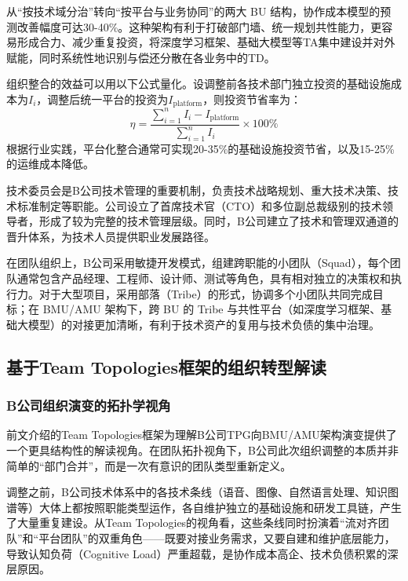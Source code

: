 从“按技术域分治”转向“按平台与业务协同”的两大 BU 结构，协作成本模型的预测改善幅度可达30-40\%。这种架构有利于打破部门墙、统一规划共性能力，更容易形成合力、减少重复投资，将深度学习框架、基础大模型等TA集中建设并对外赋能，同时系统性地识别与偿还分散在各业务中的TD\cite{li2015systematic,seaman2014measuring}。

组织整合的效益可以用以下公式量化。设调整前各技术部门独立投资的基础设施成本为$I_i$，调整后统一平台的投资为$I_{\mathrm{platform}}$，则投资节省率为：
\begin{equation}
\eta = \frac{\sum_{i=1}^{n} I_i - I_{\mathrm{platform}}}{\sum_{i=1}^{n} I_i} \times 100\%
\label{eq:platform-saving}
\end{equation}
根据行业实践，平台化整合通常可实现20-35\%的基础设施投资节省，以及15-25\%的运维成本降低。

技术委员会是B公司技术管理的重要机制，负责技术战略规划、重大技术决策、技术标准制定等职能\cite{ouyang2005ceo}。公司设立了首席技术官（CTO）和多位副总裁级别的技术领导者，形成了较为完整的技术管理层级\cite{tian2009multidisciplinary}。同时，B公司建立了技术和管理双通道的晋升体系，为技术人员提供职业发展路径\cite{kang2019post}。

在团队组织上，B公司采用敏捷开发模式，组建跨职能的小团队（Squad），每个团队通常包含产品经理、工程师、设计师、测试等角色，具有相对独立的决策权和执行力。对于大型项目，采用部落（Tribe）的形式，协调多个小团队共同完成目标；在 BMU/AMU 架构下，跨 BU 的 Tribe 与共性平台（如深度学习框架、基础大模型）的对接更加清晰，有利于技术资产的复用与技术负债的集中治理。

\subsection{基于Team Topologies框架的组织转型解读}

\subsubsection{B公司组织演变的拓扑学视角}

前文介绍的Team Topologies框架为理解B公司TPG向BMU/AMU架构演变提供了一个更具结构性的解读视角。在团队拓扑视角下，B公司此次组织调整的本质并非简单的“部门合并”，而是一次有意识的团队类型重新定义。

调整之前，B公司技术体系中的各技术条线（语音、图像、自然语言处理、知识图谱等）大体上都按照职能类型运作，各自维护独立的基础设施和研发工具链，产生了大量重复建设。从Team Topologies的视角看，这些条线同时扮演着“流对齐团队”和“平台团队”的双重角色——既要对接业务需求，又要自建和维护底层能力，导致认知负荷（Cognitive Load）严重超载，是协作成本高企、技术负债积累的深层原因。


